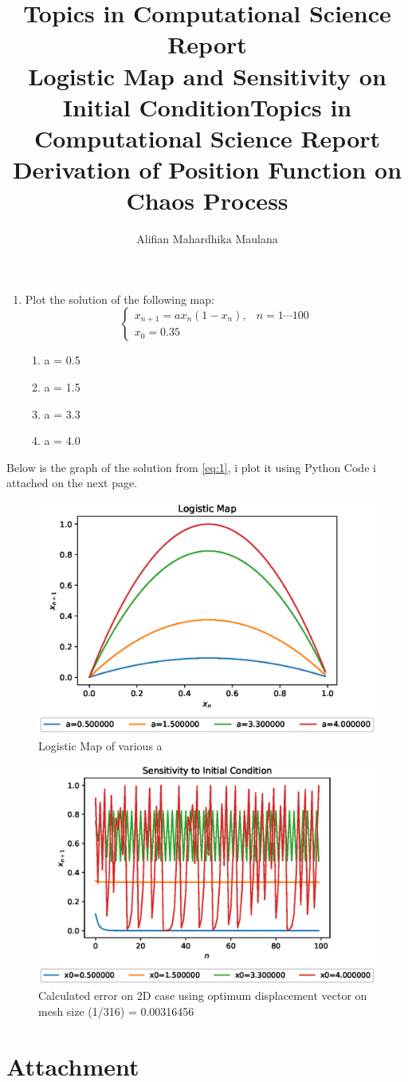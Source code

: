 \documentclass[a4paper,9pt]{article}
\title{Topics in Computational Science Report \\ Logistic Map and Sensitivity on Initial Condition}
\title{Topics in Computational Science Report \\ Derivation of Position Function on Chaos Process}
\author{Alifian Mahardhika Maulana}
\begin{document}
\maketitle
\begin{enumerate}
	\item Plot the solution of the following map:
	\begin{equation}\label{eq:1}
	\begin{cases}
	x_{n+1} = ax_n(1-x_n), & n = 1\cdots 100\\
	x_0 = 0.35
	\end{cases}
	\end{equation}
	\begin{enumerate}
		\item a = 0.5
		\item a = 1.5
		\item a = 3.3
		\item a = 4.0
	\end{enumerate}
\end{enumerate}
Below is the graph of the solution from \eqref{eq:1}, i plot it using Python Code i attached on the next page.
\begin{figure}[h!]
	\centering
	\includegraphics[width=0.6\linewidth]{picture/logisticmap}
	\caption{Logistic Map of various a}
	\label{fig:logisticmap}
\end{figure}
\begin{figure}[h!]
	\centering
	\includegraphics[width=0.6\linewidth]{picture/sensitivity}
	\caption{Calculated error on 2D case using optimum displacement vector on mesh size (1/316) = 0.00316456}
	\label{fig:sensitivity}
\end{figure}
\section{Attachment}\label{code}

\end{document}
